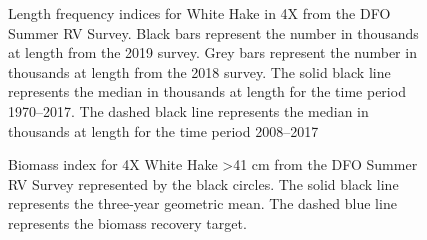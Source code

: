 \documentclass[11pt]{book}
\begin{document}
\begin{figure}[htb]

{\centering {} 

}

\caption{Length frequency indices for White Hake in 4X from the DFO Summer RV Survey. Black bars represent the number in thousands at length from the 2019 survey. Grey bars represent the number in thousands at length from the 2018 survey. The solid black line represents the median in thousands at length for the time period 1970--2017. The dashed black line represents the median in thousands at length for the time period 2008--2017}\label{fig:21-fig-whitehake-lengthfreq4X}
\end{figure}

\begin{figure}[htb]

{\centering {} 

}

\caption{Biomass index for 4X White Hake \textgreater41 cm from the DFO Summer RV Survey represented by the black circles. The solid black line represents the three-year geometric mean. The dashed blue line represents the biomass recovery target.}\label{fig:22-fig-whitehake-biomass4X-41cm}
\end{figure}
\end{document}
